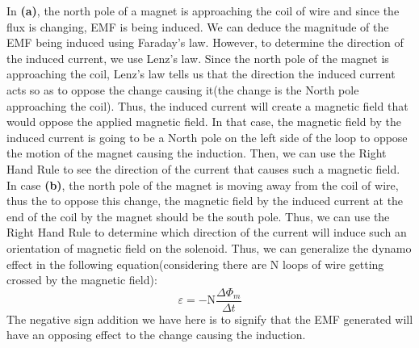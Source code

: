 \documentclass[9pt]{article}
\begin{document}
	In \textbf{(a)}, the north pole of a magnet is approaching the coil of wire and since the flux is changing, EMF is being induced. We can deduce the magnitude of the EMF being induced using Faraday's law. However, to determine the direction of the induced current, we use Lenz's law. Since the north pole of the magnet is approaching the coil, Lenz's law tells us that the direction the induced current acts so as to oppose the change causing it(the change is the North pole approaching the coil). Thus, the induced current will create a magnetic field that would oppose the applied magnetic field. In that case, the magnetic field by the induced current is going to be a North pole on the left side of the loop to oppose the motion of the magnet causing the induction. Then, we can use the Right Hand Rule to see the direction of the current that causes such a magnetic field. \newline\newline
	In case \textbf{(b)}, the north pole of the magnet is moving away from the coil of wire, thus the to oppose this change, the magnetic field by the induced current at the end of the coil by the magnet should be the south pole. Thus, we can use the Right Hand Rule to determine which direction of the current will induce such an orientation of magnetic field on the solenoid.\newline\newline
	Thus, we can generalize the dynamo effect in the following equation(considering there are N loops of wire getting crossed by the magnetic field):
	$$\varepsilon=-\text{N}\dfrac{\Delta\Phi_m}{\Delta t}$$
	The negative sign addition we have here is to signify that the EMF generated will have an opposing effect to the change causing the induction.
\end{document}
